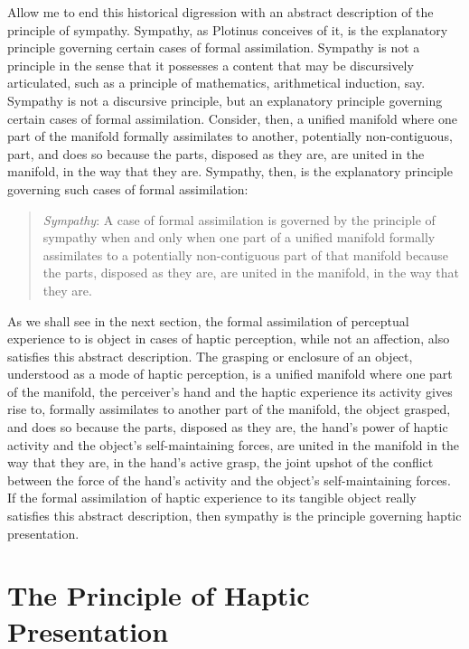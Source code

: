 Allow me to end this historical digression with an abstract description of the principle of sympathy. Sympathy, as Plotinus conceives of it, is the explanatory principle governing certain cases of formal assimilation. Sympathy is not a principle in the sense that it possesses a content that may be discursively articulated, such as a principle of mathematics, arithmetical induction, say. Sympathy is not a discursive principle, but an explanatory principle governing certain cases of formal assimilation. Consider, then, a unified manifold where one part of the manifold formally assimilates to another, potentially non-contiguous, part, and does so because the parts, disposed as they are, are united in the manifold, in the way that they are. Sympathy, then, is the explanatory principle governing such cases of formal assimilation:
\begin{quote}
	\emph{Sympathy}: A case of formal assimilation is governed by the principle of sympathy when and only when one part of a unified manifold formally assimilates to a potentially non-contiguous part of that manifold because the parts, disposed as they are, are united in the manifold, in the way that they are.
\end{quote} 
As we shall see in the next section, the formal assimilation of perceptual experience to is object in cases of haptic perception, while not an affection, also satisfies this abstract description. The grasping or enclosure of an object, understood as a mode of haptic perception, is a unified manifold where one part of the manifold, the perceiver's hand and the haptic experience its activity gives rise to, formally assimilates to another part of the manifold, the object grasped, and does so because the parts, disposed as they are, the hand’s power of haptic activity and the object's self-maintaining forces, are united in the manifold in the way that they are, in the hand's active grasp, the joint upshot of the conflict between the force of the hand’s activity and the object’s self-maintaining forces. If the formal assimilation of haptic experience to its tangible object really satisfies this abstract description, then sympathy is the principle governing haptic presentation.



\section{The Principle of Haptic Presentation} %
\label{sec:sympathy_as_the_principle_of_haptic_presentation}

